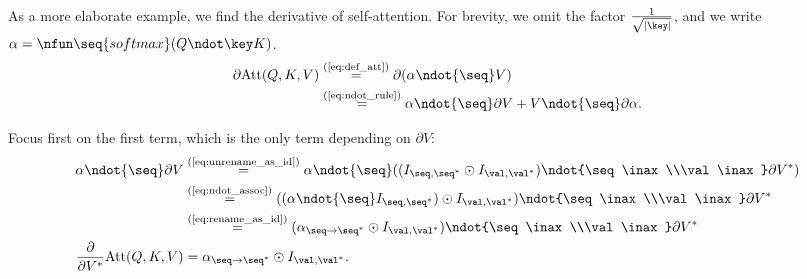 \newcommand{\smseq}[1]{\nfun\seq{softmax} #1}
\newcommand{\qk}{Q \ndot\key K}
\newcommand{\attwt}{\alpha}

As a more elaborate example, we find the derivative of self-attention. For brevity, we omit the factor $\frac{1}{\sqrt{|\key|}}$, and we write $\attwt = \nfun\seq{softmax} (Q\ndot\key K)$.
\begin{align}
\partial \text{Att}(Q, K, V)
  &\eqby{eq:def_att} \partial ( \attwt \ndot{\seq} V ) \notag \\
  &\eqby{eq:ndot_rule} \alpha \ndot{\seq} \partial V + V \ndot{\seq} \partial \alpha. \label{eq:att1}
\end{align}

Focus first on the first term, which is the only term depending on $\partial V$:
\begin{align*}
\attwt \ndot{\seq} \partial V
&\eqby{eq:unrename_as_id} \attwt \ndot{\seq} ((I_{\seq,\seq\inax} \odot I_{\val,\val\inax}) \ndot{\seq\inax\\\val\inax} \partial V\inax) \\
&\eqby{eq:ndot_assoc} ((\attwt \ndot{\seq} I_{\seq,\seq\inax}) \odot I_{\val,\val\inax}) \ndot{\seq\inax\\\val\inax} \partial V\inax \\
&\eqby{eq:rename_as_id} (\attwt_{\seq\rightarrow\seq\inax} \odot I_{\val,\val\inax}) \ndot{\seq\inax\\\val\inax} \partial V\inax \\
  \frac{\partial}{\partial V\inax}
  \text{Att}(Q,K,V) &= \attwt_{\seq\rightarrow\seq\inax} \odot I_{\val,\val\inax}.
\end{align*}

